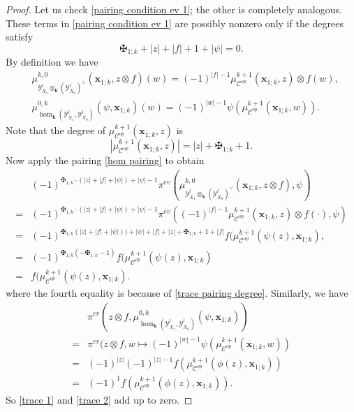 \documentclass[11pt]{amsproc}
\def\K{{\mathbf{k}}}
\def\Y{\mathcal{Y}}
\def\cc{\mathcal{C}}
\theoremstyle{remark}
\numberwithin{equation}{section}
\begin{document}
\begin{proof}
Let us check \eqref{pairing condition ev 1}; the other is completely analogous. 
These terms in \eqref{pairing condition ev 1} are possibly nonzero only if the degrees satisfy
\begin{equation}\label{trace pairing degree}
\maltese_{1;k} + |z| + |f| + 1 + |\psi| = 0.
\end{equation}
By definition we have
\begin{align}
& \mu_{\Y^{l}_{X_{1}} \otimes_{\K} (\Y^{l}_{X_{0}})^{\vee}}^{k, 0}(\mathbf{x}_{1;k}, z \otimes f)(w) = (-1)^{|f| - 1} \mu^{k+1}_{\cc^{op}}(\mathbf{x}_{1;k}, z) \otimes f(w), \\
& \mu_{\hom_{\K}(\Y^{l}_{X_{1}}, \Y^{l}_{X_{0}})}^{0, k}(\psi, \mathbf{x}_{1;k})(w) = (-1)^{|w|-1} \psi(\mu^{k+1}_{\cc^{op}}(\mathbf{x}_{1;k}, w)).
\end{align}
Note that the degree of $\mu^{k+1}_{\cc^{op}}(\mathbf{x}_{1;k}, z)$ is
\begin{equation}
|\mu^{k+1}_{\cc^{op}}(\mathbf{x}_{1;k}, z)| = |z| + \maltese_{1;k} + 1.
\end{equation}
Now apply the pairing \eqref{hom pairing} to obtain
\begin{equation}\label{trace 1}
\begin{split}
& (-1)^{\maltese_{1;k} \cdot (|z|+|f|+|\psi|) + |\psi| - 1} \pi^{ev}(\mu_{\Y^{l}_{X_{1}} \otimes_{\K} (\Y^{l}_{X_{0}})^{\vee}}^{k, 0}(\mathbf{x}_{1;k}, z \otimes f), \psi) \\
= & (-1)^{\maltese_{1;k} \cdot (|z|+|f|+|\psi|) + |\psi| - 1} \pi^{ev}((-1)^{|f| - 1} \mu^{k+1}_{\cc^{op}}(\mathbf{x}_{1;k}, z) \otimes f(\cdot), \psi) \\
= & (-1)^{\maltese_{1;k}(|z|+|f|+|\psi|)) + |\psi| + |f| + |z| + \maltese_{1;k} + 1 + |f|} f(\mu_{\cc^{op}}^{k+1}(\psi(z), \mathbf{x}_{1;k}),\\
= & (-1)^{\maltese_{1;k}(-\maltese_{1;k} - 1)} f(\mu_{\cc^{op}}^{k+1}(\psi(z), \mathbf{x}_{1;k}) \\
=  & f(\mu_{\cc^{op}}^{k+1}(\psi(z), \mathbf{x}_{1;k}).
\end{split}
\end{equation}
where the fourth equality is because of \eqref{trace pairing degree}.
Similarly, we have
\begin{equation}\label{trace 2}
\begin{split}
& \pi^{ev}(z \otimes f, \mu_{\hom_{\K}(\Y^{l}_{X_{1}}, \Y^{l}_{X_{0}})}^{0, k}(\psi, \mathbf{x}_{1;k})) \\
= &  \pi^{ev}(z \otimes f, w \mapsto (-1)^{|w|-1} \psi(\mu^{k+1}_{\cc^{op}}(\mathbf{x}_{1;k}, w))  \\
= & (-1)^{|z| } (-1)^{|z|-1} f(\mu_{\cc^{op}}^{k+1}(\phi(z), \mathbf{x}_{1;k})) \\
= & (-1)^{ 1} f(\mu_{\cc^{op}}^{k+1}(\phi(z), \mathbf{x}_{1;k})).
 \end{split}
\end{equation}
So \eqref{trace 1} and \eqref{trace 2} add up to zero.


\end{proof}
\end{document}
